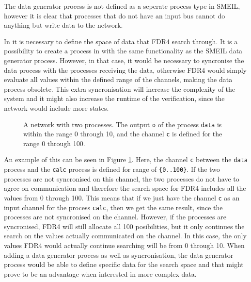 The data generator process is not defined as a seperate process type in SMEIL, however it is clear that processes that do not have an input bus cannot do anything but write data to the network.

In \cspm it is necessary to define the space of data that FDR4 search through. It is a possibility to create a process in \cspm with the same functionality as the SMEIL data generator process. However, in that case, it would be necessary to syncronise the data process with the processes receiving the data, otherwise FDR4 would simply evaluate all values within the defined range of the channels, making the data process obsolete. This extra syncronisation will increase the complexity of the system and it might also increase the runtime of the verification, since the \cspm{} network would include more states.

\begin{figure}
    \centering
    \caption{A \cspm{} network with two processes. The output \texttt{o} of the process \texttt{data} is within the range 0 through 10, and the channel \texttt{c} is defined for the range 0 through 100.}
    \label{fig:csp_data_generator_process}
\end{figure}
An example of this can be seen in Figure \ref{fig:csp_data_generator_process}. Here, the channel \texttt{c} between the \texttt{data} process and the \texttt{calc} process is defined for range of \texttt{\{0..100\}}. If the two processes are not syncronised on this channel, the two processes do not have to agree on communication and therefore the search space for FDR4 includes all the values from 0 through 100. This means that if we just have the channel \texttt{c} as an input channel for the process \texttt{calc}, then we get the same result, since the processes are not syncronised on the channel. However, if the processes are syncronised, FDR4 will still allocate all 100 posibilities, but it only continues the search on the values actually communicated on the channel. In this case, the only values FDR4 would actually continue searching will be from 0 through 10.
When adding a data generator process as well as syncronisation, the data generator process would be able to define specific data for the search space and that might prove to be an advantage when interested in more complex data.

